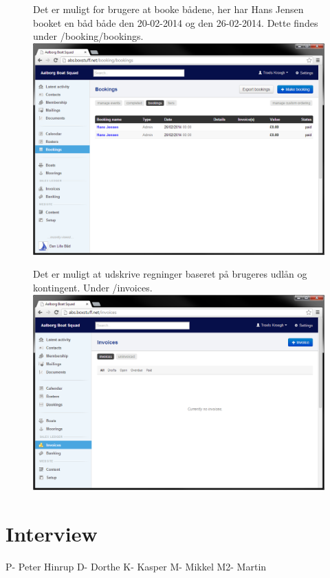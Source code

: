 \begin{figure}
	Det er muligt for brugere at booke bådene, her har Hans Jensen booket en båd både den 20-02-2014 og den 26-02-2014. Dette findes under /booking/bookings.\newline
	\includegraphics[scale=0.5]{images/teknologi/_Bookings}
\end{figure}

\begin{figure}
	Det er muligt at udskrive regninger baseret på brugeres udlån og kontingent. Under /invoices.\newline
	\includegraphics[scale=0.5]{images/teknologi/_Invoices}
\end{figure}

\chapter{Interview}\label{interview}
P- Peter Hinrup
D- Dorthe
K- Kasper
M- Mikkel
M2- Martin

